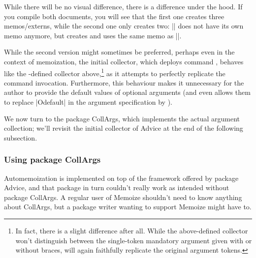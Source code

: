 \documentclass[a4paper,11pt]{article}
\begin{document}

While there will be no visual difference, there is a difference under the hood.
If you compile both documents, you will see that the first one creates three
memos\slash externs, while the second one only creates two: || does
not have its own memo anymore, but creates and uses the same memo as
||.

While the second version might sometimes be preferred, perhaps even in the
context of memoization, the initial collector, which deploys command
, behaves like the -defined
collector above,\footnote{In fact, there is a slight difference after all.
  While the above-defined collector won't distinguish between the single-token
  mandatory argument given with or without braces, 
  will again faithfully replicate the original argument tokens.} as it attempts
to perfectly replicate the command invocation.  Furthermore, this behaviour
makes it unnecessary for the author to provide the default values of optional
arguments (and even allows them to replace |O{default}| in the argument
specification by ).

We now turn to the package CollArgs, which implements the actual argument
collection; we'll revisit the initial collector of Advice at the end of the
following subsection.



\subsubsection{Using package CollArgs}
\label{sec:collargs}

Automemoization is implemented on top of the framework offered by package
Advice, and that package in turn couldn't really work as intended without
package CollArgs.  A regular user of Memoize shouldn't need to know anything
about CollArgs, but a package writer wanting to support Memoize might have to.
\end{document}
